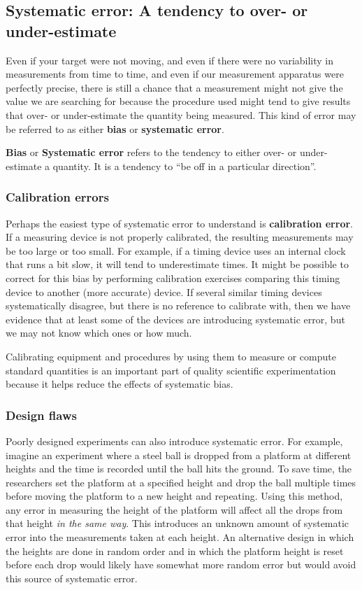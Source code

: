 \documentclass[twoside]{book}\usepackage[]{graphicx}\usepackage[]{xcolor}
\def\term#1{\textbf{#1}}
\newlength{\tempfmlength}
\newenvironment{fmpage}[1]
     {
	 \medskip
	 \setlength{\tempfmlength}{#1}
	 \begin{lrbox}{\fmbox}
	   \begin{minipage}{#1}
		 \vspace*{.02\tempfmlength}
		 \hfill
	   \begin{minipage}{.95 \tempfmlength}}
		 {\end{minipage}\hfill
		 \vspace*{.015\tempfmlength}
		 \end{minipage}\end{lrbox}\fbox{\usebox{\fmbox}}
	 \medskip
	 }
\newenvironment{boxedText}[1][.98\textwidth]%
{%
\begin{center}
\begin{fmpage}{#1}
}%
{%
\end{fmpage}
\end{center}
}
\newcounter{example}[section]
\begin{document}
\subsection{Systematic error: A tendency to over- or under-estimate}
Even if your target were not moving, and even if there were no 
variability in measurements from time to time, and even if our measurement
apparatus were perfectly precise, there is still
a chance that a measurement might not give the value we are searching 
for because the procedure used might tend to give results that over-
or under-estimate the quantity being measured.  This kind of error may be referred to as either \term{bias} or \term{systematic error}.


\begin{boxedText}
	\term{Bias} or \term{Systematic error} refers to the tendency 
to either over- or under-estimate a quantity.  It is a tendency to ``be off 
in a particular direction''.
\end{boxedText}

\subsubsection{Calibration errors}
Perhaps the easiest type of systematic error to understand is \textbf{calibration error}.
If a measuring device is not properly calibrated, the resulting measurements may be 
too large or too small.
For example, if a timing device uses an internal clock that runs a bit slow, it will
tend to underestimate times.  It might be possible to correct for this bias by
performing calibration exercises comparing this timing device to another 
(more accurate) device.  If several similar timing devices systematically
disagree, but there is no reference to calibrate with, then we have evidence
that at least some of the devices are introducing systematic error, but we may
not know which ones or how much.

Calibrating equipment and procedures by using them to measure or compute
standard quantities is an important part of quality scientific experimentation
because it helps reduce the effects of systematic bias.  


\subsubsection{Design flaws}

Poorly designed experiments can also introduce systematic error.  For example,
imagine an experiment where a steel ball is dropped from a platform at
different heights and the time is recorded until the ball hits the ground.  
To save time, the researchers set the platform at a specified height and drop the ball
multiple times before moving the platform to a new height and repeating.
Using this method, any error in measuring the height of the platform will affect all
the drops from that height \emph{in the same way}.  This introduces an unknown amount
of systematic error into the measurements taken at each height.  An alternative design
in which the heights are done in random order and in which the platform height is 
reset before each drop would likely have somewhat more random error but would avoid this
source of systematic error.
\end{document}
